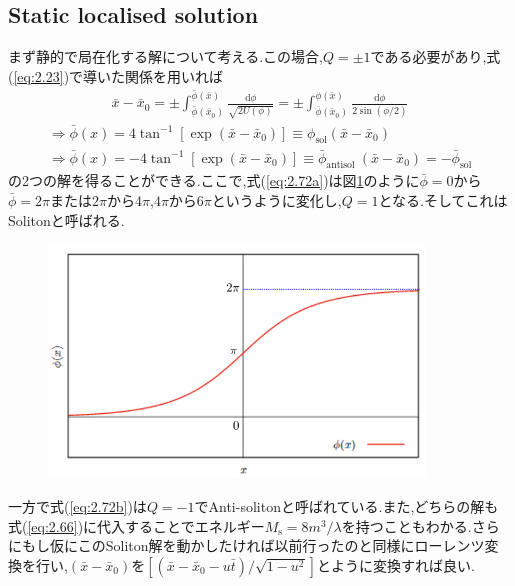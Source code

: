 \documentclass[dvipdfmx,11pt,a4paper,oneside,openany]{jsbook}
\begin{document}
\subsection{Static localised solution}
まず静的で局在化する解について考える.この場合,$Q=\pm 1$である必要があり,式(\ref{eq:2.23})で導いた関係を用いれば
\begin{align}
    \bar{x}-\bar{x}_{0}=\pm \int_{\bar{\phi}\left(\bar{x}_{0}\right)}^{\bar{\phi}(\bar{x})} \frac{\mathrm{d} \phi}{\sqrt{2 U(\phi)}}=\pm \int_{\bar{\phi}(\bar{x}_{0})}^{\phi(\bar{x})} \frac{\mathrm{d} \phi}{2 \sin (\phi / 2)}
\end{align}
\begin{subequations}
    \begin{align}
        \Rightarrow \bar{\phi}(x)=4 \tan ^{-1}\left[\exp \left(\bar{x}-\bar{x}_{0}\right)\right] \equiv \phi_{\mathrm{sol}}\left(\bar{x}-\bar{x}_{0}\right)\label{eq:2.72a} \\
        \Rightarrow \bar{\phi}(x)=-4 \tan ^{-1}\left[\exp \left(\bar{x}-\bar{x}_{0}\right)\right] \equiv \bar{\phi}_{\text {antisol }}\left(\bar{x}-\bar{x}_{0}\right)=-\bar{\phi}_{\text {sol}}\label{eq:2.72b}
    \end{align}
\end{subequations}
の2つの解を得ることができる.ここで,式(\ref{eq:2.72a})は図\ref{eq2-72_fig}のように$\bar{\phi}=0$から$\bar{\phi}=2\pi$または$2\pi$から$4\pi$,$4\pi$から$6\pi$というように変化し,$Q=1$となる.そしてこれはSolitonと呼ばれる.
\begin{figure}[H]
    \centering
    \includegraphics[width=10cm]{figure/eq2-72.png}
    \caption{}
    \label{eq2-72_fig}
\end{figure}
一方で式(\ref{eq:2.72b})は$Q=-1$でAnti-solitonと呼ばれている.また,どちらの解も式(\ref{eq:2.66})に代入することでエネルギー$M_\mathrm{s}=8m^3/\lambda$を持つこともわかる.さらにもし仮にこのSoliton解を動かしたければ以前行ったのと同様にローレンツ変換を行い,$(\bar{x}-\bar{x}_0)$を$\left[\left(\bar{x}-\bar{x}_{0}-u \bar{t}\right) / \sqrt{1-u^{2}}\right]$とように変換すれば良い.
\end{document}

